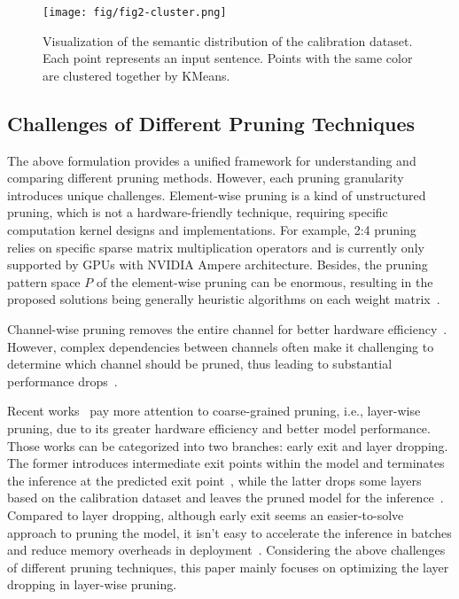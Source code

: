 \begin{figure}[t]
\centering
\texttt{[image: fig/fig2-cluster.png]}
\caption{Visualization of the semantic distribution of the calibration dataset. Each point represents an input sentence. Points with the same color are clustered together by KMeans.}
\label{fig:cluster}
\end{figure}


\subsection{Challenges of Different Pruning Techniques}
The above formulation provides a unified framework for understanding and comparing different pruning methods. 
However, each pruning granularity introduces unique challenges.
Element-wise pruning is a kind of unstructured pruning, which is not a hardware-friendly technique, requiring specific computation kernel designs and implementations.
For example, 2:4 pruning~\cite{sparcegpt, wanda, dsnot, nm_sparse1, nm_sparse2} relies on specific sparse matrix multiplication operators and is currently only supported by GPUs with NVIDIA Ampere architecture.
Besides, the pruning pattern space $P$ of the element-wise pruning can be enormous, resulting in the proposed solutions being generally heuristic algorithms on each weight matrix~\citep{sparsert, neur_prun}.

Channel-wise pruning removes the entire channel for better hardware efficiency~\citep{slicegpt,llmpruner}. 
However, complex dependencies between channels often make it challenging to determine which channel should be pruned, thus leading to substantial performance drops~\cite{att_prun}. 

Recent works~\cite {24arxiv-raee, sleb} pay more attention to coarse-grained pruning, i.e., layer-wise pruning, due to its greater hardware efficiency and better model performance.
Those works can be categorized into two branches: early exit and layer dropping.
The former introduces intermediate exit points within the model and terminates the inference at the predicted exit point~\citep{24arxiv-raee, deebert}, while the latter drops some layers based on the calibration dataset and leaves the pruned model for the inference~\citep{sleb}.
Compared to layer dropping, although early exit seems an easier-to-solve approach to pruning the model, it isn't easy to accelerate the inference in batches and reduce memory overheads in deployment~\cite{sleb}.
Considering the above challenges of different pruning techniques, this paper mainly focuses on optimizing the layer dropping in layer-wise pruning.


